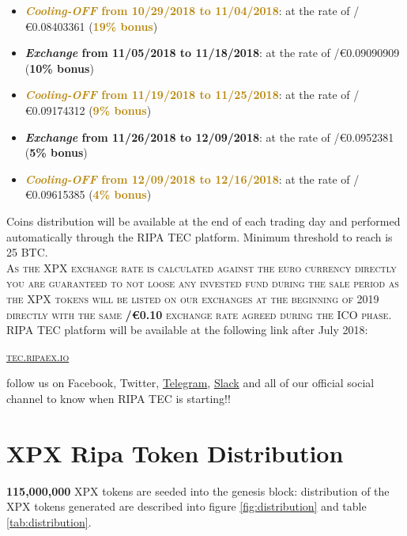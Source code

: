 \documentclass[11pt,fleqn,oneside]{book} %
\begin{document}
\begin{itemize}
	\item \textcolor{darkgoldenrod}{\textbf{\textit{Cooling-OFF} from 10/29/2018 to 11/04/2018}}: 
	at the rate of \PHP/\euro0.08403361 (\textcolor{darkgoldenrod}{\textbf{19\% bonus}})
	\item \textcolor{airforceblue}{\textbf{\textit{Exchange} from 11/05/2018 to 11/18/2018}}: at the rate of \PHP/\euro0.09090909 (\textcolor{airforceblue}{\textbf{10\% bonus}})
	\item \textcolor{darkgoldenrod}{\textbf{\textit{Cooling-OFF} from 11/19/2018 to 11/25/2018}}: 
	at the rate of \PHP/\euro0.09174312 (\textcolor{darkgoldenrod}{\textbf{9\% bonus}})
	\item \textcolor{airforceblue}{\textbf{\textit{Exchange} from 11/26/2018 to 12/09/2018}}: at the rate of \PHP/\euro0.0952381 (\textcolor{airforceblue}{\textbf{5\% bonus}})
	\item \textcolor{darkgoldenrod}{\textbf{\textit{Cooling-OFF} from 12/09/2018 to 12/16/2018}}: 
	at the rate of \PHP/\euro0.09615385 (\textcolor{darkgoldenrod}{\textbf{4\% bonus}})
\end{itemize}
\vspace{5mm}
Coins distribution will be available at the end of each trading day and performed automatically through the RIPA TEC platform. Minimum
threshold to reach is 25 BTC.\\

\textsc{As the XPX exchange rate is calculated against the euro currency directly you are guaranteed to not loose any invested fund
during the sale period as the XPX tokens will be listed on our exchanges at the beginning of 2019 directly with the same \textbf{\PHP/\euro0.10}
exchange rate agreed during the ICO phase}.\\

RIPA TEC platform will be available at the following link after July 2018:
\begin{center}
	\href{https://tec.ripaex.io}{\textsc{tec.ripaex.io}}
\end{center}
follow us on Facebook, Twitter, 
\href{https://t.me/ripaex}{Telegram}, 
\href{https://join.slack.com/t/ripaex/shared_invite/enQtMzM4NzUwNjU4OTQ0LTY3MDJmMTdhYTNlZjJlNGUxNzM1YjUwYjgyYjZlMDJmOTg3NTIzNThmNTYyMGQ3ODBkOTRmYzk3Y2Y4MzBkOTY}{Slack}
and all of our official social channel to know when RIPA TEC is starting!!

\section{XPX Ripa Token Distribution}
\textbf{115,000,000} XPX tokens are seeded into the genesis block: distribution of the XPX tokens generated are described into
figure \ref{fig:distribution} and table \ref{tab:distribution}.
\end{document}
